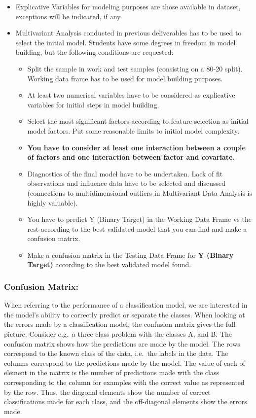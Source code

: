 \documentclass[
  18pt,
  a4paper]{article}
\providecommand{\tightlist}{%
  \setlength{\itemsep}{0pt}\setlength{\parskip}{0pt}}
\begin{document}
\begin{itemize}
\item
  Explicative Variables for modeling purposes are those available in
  dataset, exceptions will be indicated, if any.
\item
  Multivariant Analysis conducted in previous deliverables has to be
  used to select the initial model. Students have some degrees in
  freedom in model building, but the following conditions are requested:

  \begin{itemize}
  \tightlist
  \item
    Split the sample in work and test samples (consisting on a 80-20
    split). Working data frame has to be used for model building
    purposes.
  \item
    At least two numerical variables have to be considered as
    explicative variables for initial steps in model building.
  \item
    Select the most significant factors according to feature selection
    as initial model factors. Put some reasonable limits to initial
    model complexity.
  \item
    \textbf{You have to consider at least one interaction between a
    couple of factors and one interaction between factor and covariate.}
  \item
    Diagnostics of the final model have to be undertaken. Lack of fit
    observations and influence data have to be selected and discussed
    (connections to multidimensional outliers in Multivariant Data
    Analysis is highly valuable).
  \item
    You have to predict Y (Binary Target) in the Working Data Frame vs
    the rest according to the best validated model that you can find and
    make a confusion matrix.
  \item
    Make a confusion matrix in the Testing Data Frame for \textbf{Y
    (Binary Target)} according to the best validated model found.
  \end{itemize}
\end{itemize}

\hypertarget{confusion-matrix}{%
\subsubsection{Confusion Matrix:}\label{confusion-matrix}}

When referring to the performance of a classification model, we are
interested in the model's ability to correctly predict or separate the
classes. When looking at the errors made by a classification model, the
confusion matrix gives the full picture. Consider e.g.~a three class
problem with the classes A, and B. The confusion matrix shows how the
predictions are made by the model. The rows correspond to the known
class of the data, i.e.~the labels in the data. The columns correspond
to the predictions made by the model. The value of each of element in
the matrix is the number of predictions made with the class
corresponding to the column for examples with the correct value as
represented by the row. Thus, the diagonal elements show the number of
correct classifications made for each class, and the off-diagonal
elements show the errors made.
\end{document}
